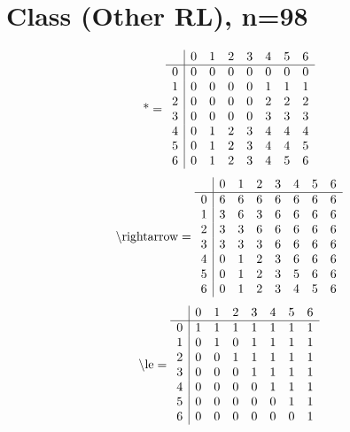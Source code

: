\documentclass[11pt]{article}
\begin{document}
\section{Class (Other RL), n=98}
\[\text{*} = 
\begin{array}{r | r r r r r r r}
 & 0 & 1 & 2 & 3 & 4 & 5 & 6 \\ \hline
0 & 0 & 0 & 0 & 0 & 0 & 0 & 0 \\
1 & 0 & 0 & 0 & 0 & 1 & 1 & 1 \\
2 & 0 & 0 & 0 & 0 & 2 & 2 & 2 \\
3 & 0 & 0 & 0 & 0 & 3 & 3 & 3 \\
4 & 0 & 1 & 2 & 3 & 4 & 4 & 4 \\
5 & 0 & 1 & 2 & 3 & 4 & 4 & 5 \\
6 & 0 & 1 & 2 & 3 & 4 & 5 & 6 \\
\end{array}
\]
\[\text{\textbackslash rightarrow} = 
\begin{array}{r | r r r r r r r}
 & 0 & 1 & 2 & 3 & 4 & 5 & 6 \\ \hline
0 & 6 & 6 & 6 & 6 & 6 & 6 & 6 \\
1 & 3 & 6 & 3 & 6 & 6 & 6 & 6 \\
2 & 3 & 3 & 6 & 6 & 6 & 6 & 6 \\
3 & 3 & 3 & 3 & 6 & 6 & 6 & 6 \\
4 & 0 & 1 & 2 & 3 & 6 & 6 & 6 \\
5 & 0 & 1 & 2 & 3 & 5 & 6 & 6 \\
6 & 0 & 1 & 2 & 3 & 4 & 5 & 6 \\
\end{array}
\]
\[\text{\textbackslash le} = 
\begin{array}{r | r r r r r r r}
 & 0 & 1 & 2 & 3 & 4 & 5 & 6 \\ \hline
0 & 1 & 1 & 1 & 1 & 1 & 1 & 1 \\
1 & 0 & 1 & 0 & 1 & 1 & 1 & 1 \\
2 & 0 & 0 & 1 & 1 & 1 & 1 & 1 \\
3 & 0 & 0 & 0 & 1 & 1 & 1 & 1 \\
4 & 0 & 0 & 0 & 0 & 1 & 1 & 1 \\
5 & 0 & 0 & 0 & 0 & 0 & 1 & 1 \\
6 & 0 & 0 & 0 & 0 & 0 & 0 & 1 \\
\end{array}
\]
\end{document}
